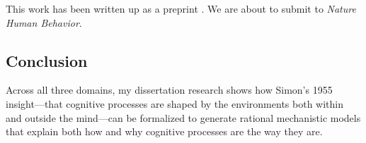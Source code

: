 \documentclass[12pt,a4paperpaper,]{article}
\begin{document}


This work has been written up as a preprint \citep{callaway2021human}. We are about to submit to \emph{Nature Human Behavior}.


\subsection{Conclusion}

Across all three domains, my dissertation research shows how Simon's 1955 insight---that cognitive processes are shaped by the environments both within and outside the mind---can be formalized to generate rational mechanistic models that explain both how and why cognitive processes are the way they are.

\pagebreak

\renewenvironment{APACrefURL}[1][]{}{}
\renewcommand{\url}[1]{}
\renewenvironment{APACrefDOI}[1][]{}{}
\renewcommand{\doi}[1]{}


\end{document}
